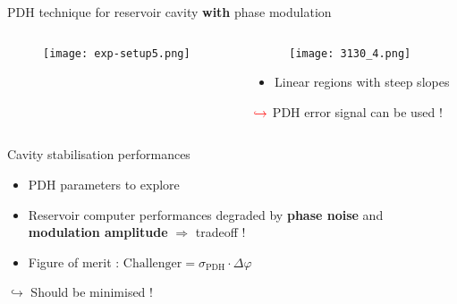 \begin{frame}{PDH technique for reservoir cavity \textbf{with} phase modulation}
	\begin{columns}
		\begin{column}{.5\textwidth}
			\begin{figure}
				\centering
				\texttt{[image: exp-setup5.png]}
			\end{figure}
		\end{column}%
		\begin{column}{.5\textwidth}
			\begin{figure}
				\centering
				\texttt{[image: 3130\_4.png]}
			\end{figure}
			\begin{itemize}
				\item Linear regions with steep slopes
			\end{itemize}
			\centering
			$\color{red}\hookrightarrow$ \alert{PDH error signal can be used !}
		\end{column}
	\end{columns}
\end{frame}

\begin{frame}{Cavity stabilisation performances}
	\begin{itemize}
		\item PDH parameters to explore
		\item Reservoir computer performances degraded by \textbf{phase noise} and \textbf{modulation amplitude} $\Rightarrow$ \alert{tradeoff !}
		\item Figure of merit : $\text{Challenger} = \sigma_{\text{PDH}} \cdot \Delta \varphi$
	\end{itemize}
	\centering
	$\hookrightarrow$ Should be minimised !
\end{frame}

